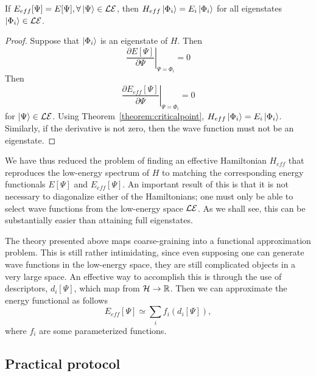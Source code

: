\begin{theorem} 	
If $E_{eff}[\Psi] = E[\Psi], \forall \ket{\Psi} \in {\cal LE}$, then $H_{eff} \ket{\Phi_i} = E_i\ket{\Phi_i}$ for all eigenstates $\ket{\Phi_i}\in {\cal LE}$.
\end{theorem}
\begin{proof}
	Suppose that $\ket{\Phi_i}$ is an eigenstate of $H$. Then 
	\begin{equation}
	\left.\frac{\partial E[\Psi]}{\partial\Psi}\right|_{\Psi=\Phi_i} = 0 
	\end{equation}
Then
\begin{equation}
	\left.\frac{\partial E_{eff}[\Psi]}{\partial\Psi}\right|_{\Psi=\Phi_i} = 0 
\end{equation}
for $\ket{\Psi} \in {\cal LE}$. Using Theorem~\ref{theorem:criticalpoint}, $H_{eff} \ket{\Phi_i} = E_i\ket{\Phi_i}$. 
Similarly, if the derivative is not zero, then the wave function must not be an eigenstate.
\end{proof}

We have thus reduced the problem of finding an effective Hamiltonian $H_{eff}$ that reproduces the low-energy spectrum of $H$ to matching the corresponding energy functionals $E[\Psi]$ and $E_{eff}[\Psi]$. 
An important result of this is that it is not necessary to diagonalize either of the Hamiltonians; one must only be able to select wave functions from the low-energy space ${\cal LE}$.
As we shall see, this can be substantially easier than attaining full eigenstates.


The theory presented above maps coarse-graining into a functional approximation problem. 
This is still rather intimidating, since even supposing one can generate wave functions in the low-energy space, they are still complicated objects in a very large space.
An effective way to accomplish this is through the use of descriptors, $d_i[\Psi]$, which map from ${\cal H} \rightarrow \mathbb{R}$.
Then we can approximate the energy functional as follows
\begin{equation}
E_{eff}[\Psi] \simeq \sum_i f_i(d_i[\Psi]),
\end{equation}
where $f_i$ are some parameterized functions.

\subsection{Practical protocol}

